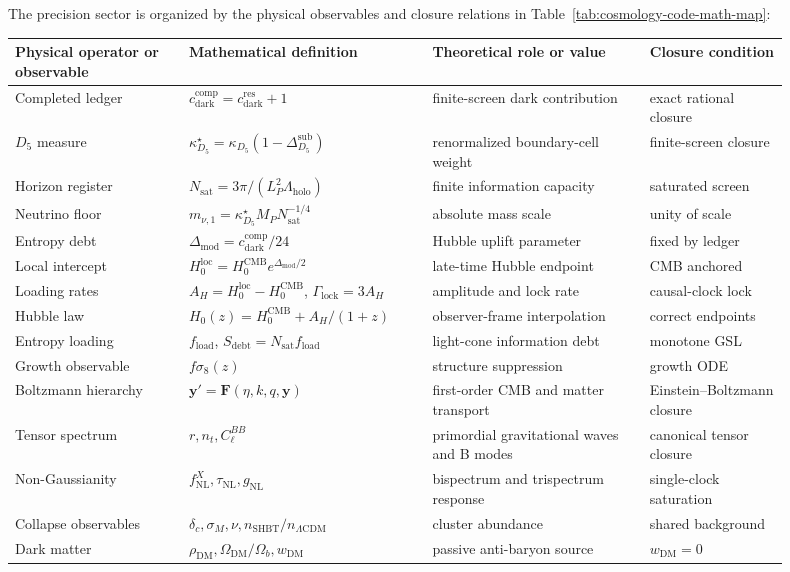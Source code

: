 \documentclass[11pt,letterpaper]{article}
\theoremstyle{plain}
\newcommand{\cdarkres}{c_{\text{dark}}^{\text{res}}}
\newcommand{\cdarkcomp}{c_{\text{dark}}^{\text{comp}}}
\newcommand{\Lholo}{\Lambda_{\text{holo}}}
\newcommand{\Nsat}{N_{\text{sat}}}
\newcommand{\Lp}{L_P}
\newcommand{\lcdm}{\ensuremath{\Lambda\mathrm{CDM}}}
\newcommand{\hcmb}{H_0^{\text{CMB}}}
\newcommand{\hloc}{H_0^{\text{loc}}}
\newcommand{\DeltaMod}{\Delta_{\text{mod}}}
\newcommand{\fload}{f_{\text{load}}}
\newcommand{\debtentropy}{S_{\text{debt}}}
\newcommand{\GammaLock}{\Gamma_{\text{lock}}}
\newcommand{\AH}{A_H}
\newcommand{\kappad}{\kappa_{D_5}}
\begin{document}
The precision sector is organized by the physical observables and closure
relations in Table~\ref{tab:cosmology-code-math-map}:
\begin{table}[htbp]
\centering
\scriptsize
\begin{tabular}{@{}L{0.20\linewidth}L{0.29\linewidth}L{0.25\linewidth}L{0.16\linewidth}@{}}
\toprule
Physical operator or observable & Mathematical definition & Theoretical role or value & Closure condition \\
\midrule
Completed ledger & $\cdarkcomp=\cdarkres+1$ & finite-screen dark contribution & exact rational closure \\
$D_5$ measure & $\kappad^\star=\kappad(1-\Delta_{D_5}^{\text{sub}})$ & renormalized boundary-cell weight & finite-screen closure \\
Horizon register & $\Nsat=3\pi/(\Lp^2\Lholo)$ & finite information capacity & saturated screen \\
Neutrino floor & $m_{\nu,1}=\kappad^\star M_P\Nsat^{-1/4}$ & absolute mass scale & unity of scale \\
Entropy debt & $\DeltaMod=c_{\text{dark}}^{\text{comp}}/24$ & Hubble uplift parameter & fixed by ledger \\
Local intercept & $\hloc=\hcmb e^{\DeltaMod/2}$ & late-time Hubble endpoint & CMB anchored \\
Loading rates & $\AH=\hloc-\hcmb$, $\GammaLock=3\AH$ & amplitude and lock rate & causal-clock lock \\
Hubble law & $H_0(z)=\hcmb+\AH/(1+z)$ & observer-frame interpolation & correct endpoints \\
Entropy loading & $\fload$, $\debtentropy=\Nsat\fload$ & light-cone information debt & monotone GSL \\
Growth observable & $f\sigma_8(z)$ & structure suppression & growth ODE \\
Boltzmann hierarchy & $\mathbf y'=\mathbf F(\eta,k,q,\mathbf y)$ & first-order CMB and matter transport & Einstein--Boltzmann closure \\
Tensor spectrum & $r,n_t,C_\ell^{BB}$ & primordial gravitational waves and B modes & canonical tensor closure \\
Non-Gaussianity & $f_{\mathrm{NL}}^{X},\tau_{\mathrm{NL}},g_{\mathrm{NL}}$ & bispectrum and trispectrum response & single-clock saturation \\
Collapse observables & $\delta_c,\sigma_M,\nu,n_{\text{SHBT}}/n_{\lcdm}$ & cluster abundance & shared background \\
Dark matter & $\rho_{\text{DM}},\Omega_{\text{DM}}/\Omega_b,w_{\text{DM}}$ & passive anti-baryon source & $w_{\text{DM}}=0$ \\

\end{tabular}
\end{table}
\end{document}

